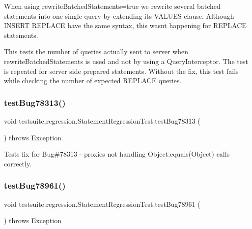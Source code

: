 When using \textquotesingle{}rewrite\+Batched\+Statements=true\textquotesingle{} we rewrite several batched statements into one single query by extending its V\+A\+L\+U\+ES clause. Although I\+N\+S\+E\+RT R\+E\+P\+L\+A\+CE have the same syntax, this wasn\textquotesingle{}t happening for R\+E\+P\+L\+A\+CE statements.

This tests the number of queries actually sent to server when rewrite\+Batched\+Statements is used and not by using a Query\+Interceptor. The test is repeated for server side prepared statements. Without the fix, this test fails while checking the number of expected R\+E\+P\+L\+A\+CE queries. \mbox{\label{classtestsuite_1_1regression_1_1_statement_regression_test_adfebb14cf4625719dc11d7397ae26d6f}} 
\subsubsection{\texorpdfstring{test\+Bug78313()}{testBug78313()}}
{\footnotesize\ttfamily void testsuite.\+regression.\+Statement\+Regression\+Test.\+test\+Bug78313 (\begin{DoxyParamCaption}{ }\end{DoxyParamCaption}) throws Exception}

Tests fix for Bug\#78313 -\/ proxies not handling Object.\+equals(\+Object) calls correctly. \mbox{\label{classtestsuite_1_1regression_1_1_statement_regression_test_a0813e2cf77078b1f8476ef827c5c9046}} 
\subsubsection{\texorpdfstring{test\+Bug78961()}{testBug78961()}}
{\footnotesize\ttfamily void testsuite.\+regression.\+Statement\+Regression\+Test.\+test\+Bug78961 (\begin{DoxyParamCaption}{ }\end{DoxyParamCaption}) throws Exception}

